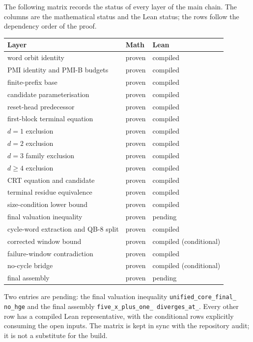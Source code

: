 The following matrix records the status of every layer of the main
chain.  The columns are the mathematical status and the Lean status;
the rows follow the dependency order of the proof.

\begin{center}
\small
\begin{tabular}{@{}p{}p{}p{}@{}}
\toprule
Layer & Math & Lean \\
\midrule
word orbit identity & proven & compiled \\
PMI identity and PMI-B budgets & proven & compiled \\
finite-prefix base & proven & compiled \\
candidate parameterisation & proven & compiled \\
reset-head predecessor & proven & compiled \\
first-block terminal equation & proven & compiled \\
$d=1$ exclusion & proven & compiled \\
$d=2$ exclusion & proven & compiled \\
$d=3$ family exclusion & proven & compiled \\
$d\ge4$ exclusion & proven & compiled \\
CRT equation and candidate & proven & compiled \\
terminal residue equivalence & proven & compiled \\
size-condition lower bound & proven & compiled \\
final valuation inequality & proven & pending \\
cycle-word extraction and QB-8 split & proven & compiled \\
corrected window bound & proven & compiled (conditional) \\
failure-window contradiction & proven & compiled \\
no-cycle bridge & proven & compiled (conditional) \\
final assembly & proven & pending \\
\bottomrule
\end{tabular}
\end{center}

Two entries are pending: the final valuation inequality
\texttt{unified\_\allowbreak core\_\allowbreak final\_\allowbreak
no\_\allowbreak hge} and the final assembly
\texttt{five\_\allowbreak x\_\allowbreak plus\_\allowbreak one\_\allowbreak
diverges\_\allowbreak at\_}.  Every other row has a
compiled Lean representative, with the conditional rows explicitly
consuming the open inputs.  The matrix is kept in sync with the
repository audit; it is not a substitute for the build.
